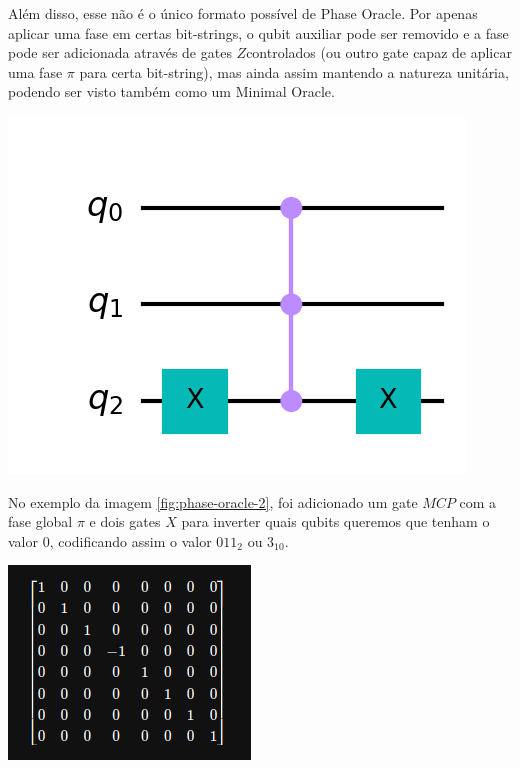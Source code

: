 \documentclass{article}
\begin{document}
Além disso, esse não é o único formato possível de Phase Oracle. Por apenas aplicar uma fase em certas bit-strings, o qubit auxiliar pode ser removido e a fase pode ser adicionada através de gates $Z$controlados (ou outro gate capaz de aplicar uma fase $\pi$ para certa bit-string), mas ainda assim mantendo a natureza unitária, podendo ser visto também como um Minimal Oracle.
\\
\begin{center}
	\includegraphics[scale=0.3]{phase_oracle_2.png}
	\label{fig:phase-oracle-2}
\end{center}


No exemplo da imagem \ref{fig:phase-oracle-2}, foi adicionado um gate $MCP$ com a fase global $\pi$ e dois gates $X$ para inverter quais qubits queremos que tenham o valor $0$, codificando assim o valor $011_{2}$ ou $3_{10}$.

\begin{center}
	\includegraphics[scale=0.5]{phase_oracle_unitary.png}
	\label{fig:phase-oracle-unitary}
\end{center}
\end{document}
